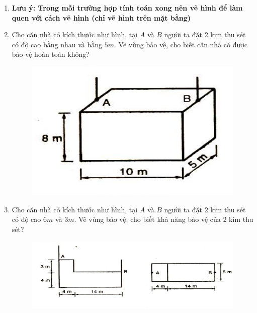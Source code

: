 \documentclass[12pt,a4paper]{article}
\begin{document}
    \begin{enumerate}
        \item[] \textbf{Lưu ý: Trong mỗi trường hợp tính toán xong nên vẽ hình để làm quen với cách vẽ hình (chỉ vẽ hình trên mặt bằng)}
        \item Cho căn nhà có kích thước như hình, tại  $A$ và $B$ người ta đặt 2 kim thu sét có độ cao bằng nhau và bằng $5m$. Vẽ vùng bảo vệ, cho biết căn nhà có được bảo vệ hoàn toàn không?
            \begin{figure}[htp]
                \begin{center}
                    \includegraphics[scale=.4]{baitap1}
                \end{center}
            \end{figure}
            
        \item Cho căn nhà có kích thước như hình, tại  $A$ và $B$ người ta đặt 2 kim thu sét có độ cao $6m$ và $3m$. Vẽ vùng bảo vệ, cho biết khả năng bảo vệ của 2 kim thu sét?
            \begin{figure}[htp]
                \begin{center}
                    \includegraphics[scale=.4]{baitap2}
                \end{center}
            \end{figure}
            

\end{enumerate}
\end{document}
